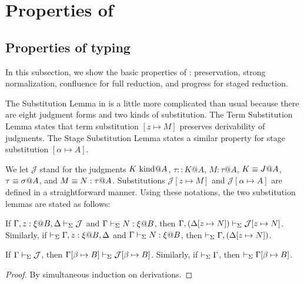 
\section{Properties of \LMD \label{sec:properties}}

\subsection{Properties of typing}

In this subsection, we show the basic properties of \LMD: preservation, strong
normalization, confluence for full reduction, and progress for staged
reduction.


The Substitution Lemma in \LMD{} is a little more complicated than usual because there are eight judgment forms and two kinds of substitution.  The Term Substitution Lemma states that term substitution $[z \mapsto M]$ preserves derivability of judgments. The Stage Substitution Lemma states a similar property for stage substitution $[\alpha\mapsto A]$.  

We let $\mathcal{J}$ stand for the judgments $K \text{\ kind} @A$, $\tau::K@A$,
$M:\tau@A$, $K \equiv J @ A$, $\tau \equiv \sigma @ A$, and
$M \equiv N : \tau @ A$.  Substitutions $\mathcal{J}[z \mapsto M]$ and
$\mathcal{J}[\alpha \mapsto A]$ are defined in a straightforward
manner.  Using these notations, the two substitution lemmas are stated as follows:

\begin{lemma}
    \label{lemma:TermSubstitution}
    If $\G, z:\xi@B, \D \V \mathcal{J}$ and $\Gamma\vdash_\Sigma N:\xi @B$, then $\Gamma, (\Delta[z \mapsto N]) \vdash_\Sigma \mathcal{J}[z \mapsto N]$.  Similarly, if $\V \G, z:\xi@B, \D$ and
    $\Gamma\vdash_\Sigma N:\xi @B$, then $\vdash_\Sigma \Gamma, (\Delta[z \mapsto N])$.
\end{lemma}

\begin{lemma}
    \label{lemma:StageSubstitution}
    If $\Gamma \vdash_\Sigma \mathcal{J}$, then $\Gamma[\beta\mapsto B] \vdash_\Sigma \mathcal{J}[\beta\mapsto B]$.  Similarly, if $\vdash_\Sigma \Gamma$, then $\vdash_\Sigma \Gamma[\beta\mapsto B]$.
\end{lemma}

\begin{proof}
    By simultaneous induction on derivations.
\end{proof}


